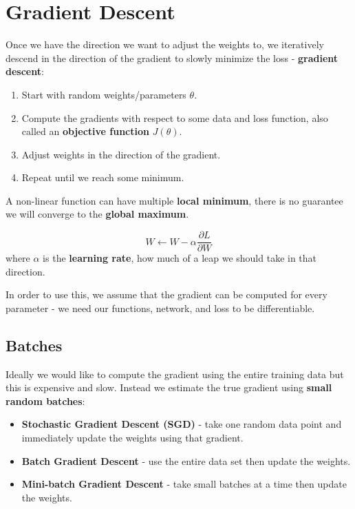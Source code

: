 \documentclass[11pt]{article}
\begin{document}
\section{Gradient Descent}
Once we have the direction we want to adjust the weights to, we iteratively descend in the direction of the gradient to slowly minimize the loss - \textbf{gradient descent}:
\begin{enumerate}
  \item Start with random weights/parameters $\theta$.
  \item Compute the gradients with respect to some data and loss function, also called an \textbf{objective function} $J(\theta)$.
  \item Adjust weights in the direction of the gradient.
  \item Repeat until we reach some minimum.
\end{enumerate}
A non-linear function can have multiple \textbf{local minimum}, there is no guarantee we will converge to the \textbf{global maximum}.

\[
  W \leftarrow W - \alpha \frac{\partial L}{\partial W} 
\]
where $\alpha$ is the \textbf{learning rate}, how much of a leap we should take in that direction.

In order to use this, we assume that the gradient can be computed for every parameter - we need our functions, network, and loss to be differentiable.

\subsection{Batches}
Ideally we would like to compute the gradient using the entire training data but this is expensive and slow.
Instead we estimate the true gradient using \textbf{small random batches}:
\begin{itemize}
  \item \textbf{Stochastic Gradient Descent (SGD)} - take one random data point and immediately update the weights using that gradient.
  \item \textbf{Batch Gradient Descent} - use the entire data set then update the weights.
  \item \textbf{Mini-batch Gradient Descent} - take small batches at a time then update the weights.
\end{itemize}
\end{document}
